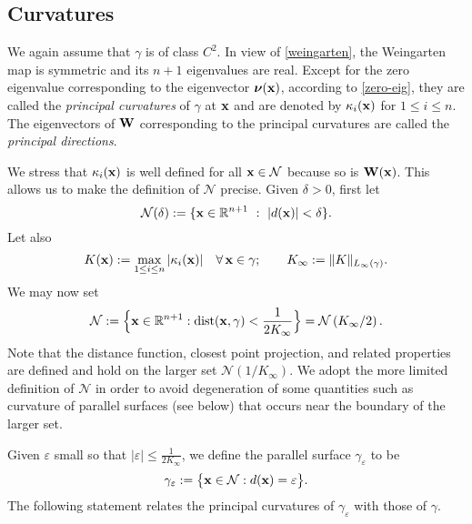 \subsection{Curvatures}\label{S:curvatures}
%
We again assume that $\gamma$ is of class $C^2$.
In view of \eqref{weingarten}, the Weingarten map is symmetric and its
$n+1$ eigenvalues are real.
Except for the zero eigenvalue corresponding to the eigenvector ${\boldsymbol \nu}({\bf x})$,
according to \eqref{zero-eig}, they are called the {\it principal curvatures}
of $\gamma$ at ${\bf x}$ and are denoted by $\kappa_i({\bf x})$ for $1\le i \le n$.
The eigenvectors of ${\bf W}$ corresponding to the principal curvatures are called the {\it principal directions}.

We stress that $\kappa_i({\bf x})$ is well defined for all ${\bf x} \in \mathcal N$
because so is ${\bf W}({\bf x})$.
This allows us to make the definition of $\mathcal N$ precise. Given $\delta>0$, first let
%
\begin{equation}\label{e:delta-tube}
\mathcal N(\delta) := \{ {\bf x} \in \mathbb R^{n+1} \ : \ |d({\bf x})| < \delta \}.
\end{equation}
 Let also
%
\begin{equation}\label{K:def}
  K({\bf x}) := \max_{1 \le i \le n} |\kappa_i({\bf x})| \quad\forall \, {\bf x} \in \gamma;
  \qquad
  K_\infty := \|K\|_{L_\infty(\gamma)} . 
\end{equation}
We may now set
\begin{equation}\label{N:def}
  \mathcal{N} := \Big\{ {\bf x} \in \mathbb{R}^{n+1}:
  \operatorname{dist} ({\bf x}, \gamma) < \frac{1}{2 K_\infty} \Big\}=\mathcal{N}\left(K_\infty/2\right).
\end{equation}
%
Note that the distance function, closest point projection, and related properties are defined and hold on the larger set $\mathcal{N}(1/K_\infty)$.  We adopt the more limited definition of $\mathcal{N}$ in order to avoid degeneration of some quantities such as curvature of parallel surfaces (see below) that occurs near the boundary of the larger set.

Given $\varepsilon$ small so that $|\varepsilon| \le \frac{1}{2K_\infty}$,
we define the parallel surface $\gamma_\varepsilon$ to be
%
\[
\gamma_\varepsilon := \big\{{\bf x}\in\mathcal N: d({\bf x}) = \varepsilon \big\}.
\]
%
The following statement relates the principal curvatures of $\gamma_\varepsilon$ with
those of $\gamma$.

